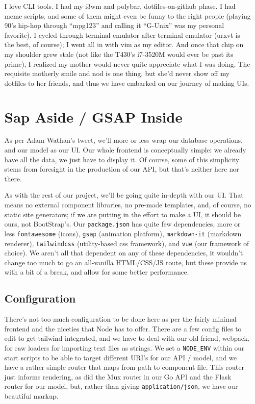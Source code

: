 \documentclass[11pt, twoside, reqno]{book}
\begin{document}
I love CLI tools. I had my i3wm and polybar, dotfiles-on-github phase. I had meme scripts, and some of them might even be funny to the right people (playing 90's hip-hop through ``mpg123'' and calling it ``G-Unix'' was my personal favorite). I cycled through terminal emulator after terminal emulator (urxvt is the best, of course); I went all in with vim as my editor. And once that chip on my shoulder grew stale (not like the T430's i7-3520M would ever be past its prime), I realized my mother would never quite appreciate what I was doing. The requisite motherly smile and nod is one thing, but she'd never show off my dotfiles to her friends, and thus we have embarked on our journey of making UIs.


\section{Sap Aside / GSAP Inside}

As per Adam Wathan's tweet, we'll more or less wrap our database operations, and our model as our UI. Our whole frontend is conceptually simple: we already have all the data, we just have to display it. Of course, some of this simplicity stems from foresight in the production of our API, but that's neither here nor there.

As with the rest of our project, we'll be going quite in-depth with our UI. That means no external component libraries, no pre-made templates, and, of course, no static site generators; if we are putting in the effort to make a UI, it should be ours, not BootStrap's. Our \texttt{package.json} has quite few dependencies, more or less \texttt{fontawesome} (icons), \texttt{gsap} (animation platform), \texttt{markdown-it} (markdown renderer), \texttt{tailwindcss} (utility-based css framework), and \texttt{vue} (our framework of choice). We aren't all that dependent on any of these dependencies, it wouldn't change too much to go an all-vanilla HTML/CSS/JS route, but these provide us with a bit of a break, and allow for some better performance.

\subsection{Configuration}

There's not too much configuration to be done here as per the fairly minimal frontend and the niceties that Node has to offer. There are a few config files to edit to get tailwind integrated, and we have to deal with our old friend, webpack, for raw loaders for importing text files as strings. We set a \texttt{NODE\_ENV} within our start scripts to be able to target different URI's for our API / model, and we have a rather simple router that maps from path to component file. This router just informs rendering, as did the Mux router in our Go API and the Flask router for our model, but, rather than giving \texttt{application/json}, we have our beautiful markup.
\end{document}

